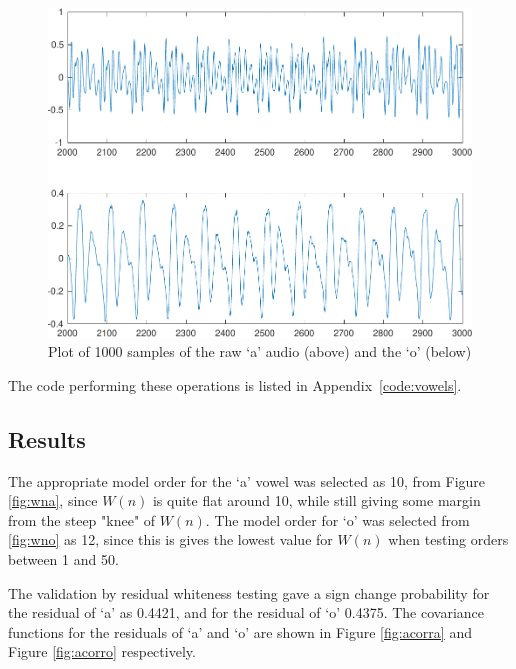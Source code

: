 \documentclass{IEEEtran}
\begin{document}
\begin{figure}[h!]
    \centering
    \captionsetup{justification=centering}
    \includegraphics[width=0.8\columnwidth]{pictures/raw_o_audio.pdf}
    \caption{Plot of 1000 samples of the raw `a' audio (above) and the `o'
    (below)}
    \label{fig:rawaudio}
\end{figure}

The code performing these operations is listed in Appendix~\ref{code:vowels}.

\subsection{Results}

The appropriate model order for the `a' vowel was selected as 10, from Figure
\ref{fig:wna}, since $W(n)$ is quite flat around 10, while still giving some
margin from the steep "knee" of $W(n)$. The model order for `o' was selected
from \ref{fig:wno} as 12, since this is gives the lowest value for $W(n)$
when testing orders between 1 and 50.

The validation by residual whiteness testing gave a sign change probability for
the residual of `a' as 0.4421, and for the residual of `o' 0.4375. The
covariance functions for the
residuals of `a' and `o' are shown in Figure \ref{fig:acorra} and Figure
\ref{fig:acorro} respectively.
\end{document}
